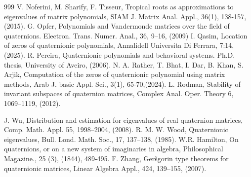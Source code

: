 \documentclass [12pt]{article}
\begin{document}
\begin{thebibliography}{999}
            V. Noferini, M. Sharify, F. Tisseur, Tropical roots as approximations to eigenvalues of matrix polynomials, SIAM J. Matrix Anal. Appl., 36(1), 138-157, (2015). 
            G. Opfer, Polynomials and Vandermonde matrices over the field of quaternions. Electron. Trans. Numer. Anal., 36, 9–16, (2009)
            I. Qasim, Location of zeros of quaternionic polynomials, Annalidell Universita Di Ferrara, 7:14, (2025).
            R. Pereira, Quaternionic polynomials and behavioral systems. Ph.D. thesis, University of Aveiro, (2006).
            N. A. Rather, T. Bhat, I. Dar, B. Khan, S. Arjik, Computation of the zeros of quaternionic polynomial using matrix methods, Arab J. basic Appl. Sci., 3(1), 65-70,(2024).
            L. Rodman, Stability of invariant subspaces of quaternion matrices, Complex Anal. Oper. Theory 6, 1069–1119, (2012).
      	
  J. Wu, Distribution and estimation for eigenvalues of real quaternion matrices, Comp. Math. Appl. 55, 1998–2004, (2008).
 R. M. W. Wood, Quaternionic eigenvalues, Bull. Lond. Math. Soc., 17, 137–138, (1985).
  W.R. Hamilton, On quaternions, or on a new system of imaginaries in algebra, Philosophical Magazine., 25 (3), (1844), 489-495.
 F. Zhang, Ger\v{s}gorin type theorems for quaternionic matrices, Linear Algebra Appl., 424, 139–155, (2007).
  
    \end{thebibliography}
\end{document}
